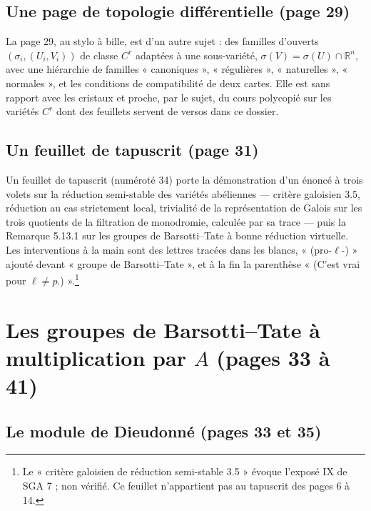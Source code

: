 \documentclass[11pt,a4paper]{article}
\begin{document}
\subsection*{Une page de topologie différentielle (page 29)}

La page 29, au stylo à bille, est d'un autre sujet : des familles d'ouverts
$(\sigma_{i}, (U_{i}, V_{i}))$ de classe $C^{r}$ adaptées à une
sous-variété, $\sigma(V) = \sigma(U) \cap \mathbb{R}^{n}$, avec une
hiérarchie de familles « canoniques », « régulières », « naturelles »,
« normales », et les conditions de compatibilité de deux cartes. Elle est
sans rapport avec les cristaux et proche, par le sujet, du cours polycopié
sur les variétés $C^{r}$ dont des feuillets servent de versos dans ce dossier.

\subsection*{Un feuillet de tapuscrit (page 31)}

Un feuillet de tapuscrit (numéroté 34) porte la démonstration d'un énoncé à
trois volets sur la réduction semi-stable des variétés abéliennes —
critère galoisien 3.5, réduction au cas strictement local, trivialité de la
représentation de Galois sur les trois quotients de la filtration de
monodromie, calculée par sa trace — puis la Remarque 5.13.1 sur les groupes de
Barsotti--Tate à bonne réduction virtuelle. Les interventions à la main sont
des lettres tracées dans les blancs, « (pro-$\ell$-) » ajouté devant
« groupe de Barsotti--Tate », et à la fin la parenthèse « (C'est vrai pour
$\ell \ne p$.) ».\footnote{Le « critère galoisien de réduction semi-stable
3.5 » évoque l'exposé IX de SGA 7 ; non vérifié. Ce feuillet n'appartient pas
au tapuscrit des pages 6 à 14.}

\section*{Les groupes de Barsotti--Tate à multiplication par $A$ (pages 33 à 41)}

\subsection*{Le module de Dieudonné (pages 33 et 35)}
\end{document}
